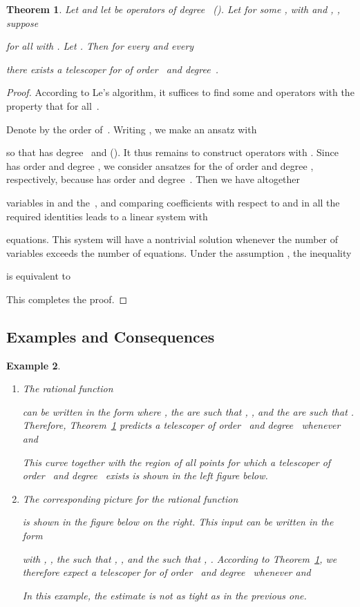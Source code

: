 \documentclass{sig-alternate}
\newtheorem{theorem}{Theorem}
\newtheorem{example}[theorem]{Example}
\begin{document}
\begin{theorem}\label{thm:curve:rat}
  Let  and let 
  be operators of degree~ ().
  Let  for some ,
   with  and , , suppose
  
  for all  with . Let .
  Then for every  and every
  
  there exists a telescoper  for  of order~ and degree~.
\end{theorem}
\begin{proof}
  According to Le's algorithm, it suffices to find some  and operators
   with the property that  for all~.

  Denote by  the order of~.  Writing , we
  make an ansatz  with
  
  so that  has degree~ and  ().
  It thus remains to construct operators  with .
  Since  has order  and degree , we consider
  ansatzes for the  of order  and degree , respectively,
  because  has order  and degree~.
  Then we have altogether
  
  variables in  and the~, and comparing coefficients with respect to  and 
  in all the required identities  leads to a linear system with
  
  equations. This system will have a nontrivial solution whenever the number of variables
  exceeds the number of equations. Under the assumption , the inequality
  
  is equivalent to
  
  This completes the proof.
\end{proof}

\subsection{Examples and Consequences}

\begin{example}\label{ex:rat}
  \begin{enumerate}
  \item The rational function
    
    can be written in the form  where
    ,
    the  are such that , , and
    the  are such that .
    Therefore, Theorem~\ref{thm:curve:rat} predicts a telescoper of order~ and degree~
    whenever  and
    
    This curve together with the region of all points  for which 
    a telescoper of order~ and degree~ exists is shown in the left figure below.
  \item The corresponding picture for the rational function
    
    is shown in the figure below on the right. This input can be written in the form
    
    with ,
    ,
    the  such that , , and
    the  such that , .
    According to Theorem~\ref{thm:curve:rat}, we therefore expect a telescoper for 
    of order~ and degree~ whenever  and
    
    In this example, the estimate is not as tight as in the previous one.
  \end{enumerate}
\end{example}
\end{document}
